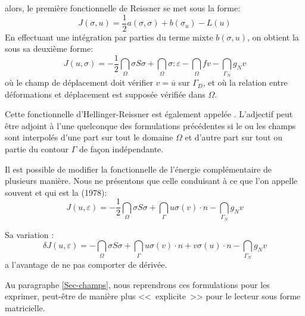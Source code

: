 alors, le première fonctionnelle de Reissner se met sous la forme:
\begin{equation} J(\sigma,u) = \frac12a(\sigma,\sigma)+b(\sigma_u)-L(u)\end{equation}
\medskip
En effectuant une intégration par parties du terme mixte $b(\sigma,u)$, on obtient la
sous sa deuxième forme:
\begin{equation}
\label{Eq-HR2}
J(u,\sigma) =
-\frac12 \dint_\Omega \sigma S \sigma
+\dint_\Omega \sigma :\varepsilon
- \dint_\Omega f v
- \dint_{\Gamma_N} g_N v
\end{equation}
où le champ de déplacement doit vérifier $v=\overline{u}$ sur $\Gamma_D$,
et où la relation entre déformations et déplacement est supposée vérifiée dans $\Omega$.

Cette fonctionnelle d'Hellinger-Reissner est également appelée .
\medskip
L'adjectif  peut être adjoint à l'une quelconque des formulations
précédentes si le ou les champs sont interpolés d'une part sur tout le domaine $\Omega$
et d'autre part sur tout ou partie du contour $\Gamma$ de façon indépendante.

Il est possible de modifier la fonctionnelle de l'énergie complémentaire de plusieurs manière.
Nous ne présentons que celle conduisant à ce que l'on appelle souvent  et
qui est la 
(1978):
\begin{equation}
J(u,\varepsilon) =
-\frac12 \dint_\Omega \sigma S \sigma
+\dint_\Gamma u \sigma(v)\cdot n
- \dint_{\Gamma_N} g_N v
\end{equation}

Sa variation :
\begin{equation}
\delta J(u,\varepsilon) =
-\dint_\Omega \sigma S \sigma
+\dint_\Gamma u \sigma(v)\cdot n + v \sigma(u)\cdot n
- \dint_{\Gamma_N} g_N v
\end{equation}
a l'avantage de ne pas comporter de dérivée.

\medskip
Au paragraphe \ref{Sec-champs}, nous reprendrons ces formulations pour les exprimer,
peut-être de manière plus <<~explicite~>> pour le lecteur sous forme matricielle.

